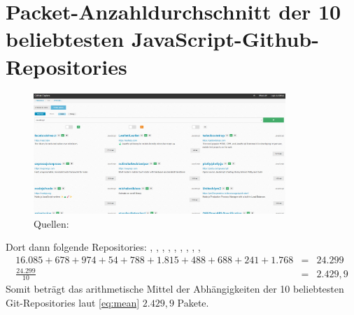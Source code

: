 \section{Packet-Anzahldurchschnitt der 10 beliebtesten JavaScript-Github-Repositories} \label{sec:PackageMeanPopGitJsRepos}
    \begin{figure}[H]
        \centering
        \includegraphics[width=0.85\textwidth]{Appendix/gitmost_wanted_2024-04-29 181855.png}
        \caption{Quellen: \cite{link:GitPopJsRepoMostWanted}}
        \label{png:gitMostWanted}
    \end{figure}
    Dort dann folgende Repositories: \cite{link:GitPopJsRepoReact}, \cite{link:GitPopJsRepoLeaflet}, \cite{link:GitPopJsRepoBootstrap}, \cite{link:GitPopJsRepoExpress}, \cite{link:GitPopJsRepoSwiper}, \cite{link:GitPopJsRepoPlotly}, \cite{link:GitPopJsRepoNode}, \cite{link:GitPopJsRepoAos}, \cite{link:GitPopJsRepoPm2}, \cite{link:GitPopJsRepoAxios}
    \begin{eqnarray}
        16.085 + 678 + 974 + 54 + 788 + 1.815 + 488 + 688 + 241 + 1.768 &=& 24.299
        \label{eq:summe} \\
        \frac{24.299}{10} &=& 2.429,9
        \label{eq:mean}
    \end{eqnarray}
    Somit beträgt das arithmetische Mittel der Abhängigkeiten der 10 beliebtesten Git-Repositories laut \eqref{eq:mean} $2.429,9$ Pakete.
